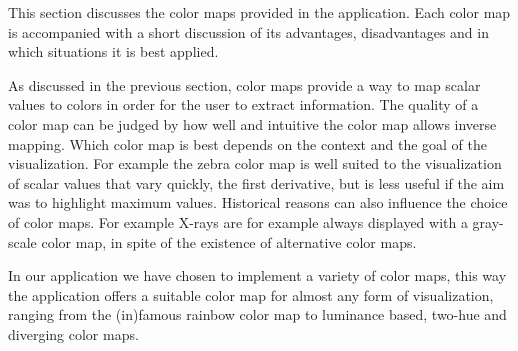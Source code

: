 This section discusses the color maps provided in the application. Each color map is accompanied with a short discussion of its advantages, disadvantages and in which situations it is best applied. 

As discussed in the previous section, color maps provide a way to map scalar values to colors in order for the user to extract information. The quality of a color map can be judged by how well and intuitive the color map allows inverse mapping. Which color map is best depends on the context and the goal of the visualization. For example the zebra color map is well suited to the visualization of scalar values that vary quickly, \ie the first derivative, but is less useful if the aim was to highlight maximum values. Historical reasons can also influence the choice of color maps. For example X-rays are for example always displayed with a gray-scale color map, in spite of the existence of alternative color maps.

In our application we have chosen to implement a variety of color maps, this way the application offers a suitable color map for almost any form of visualization, ranging from the (in)famous rainbow color map to luminance based, two-hue and diverging color maps.

